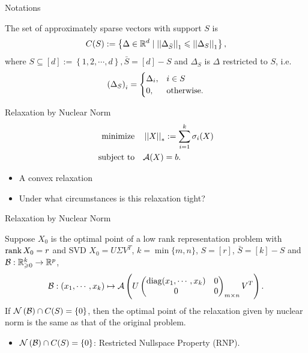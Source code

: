 \documentclass{beamer}
\begin{document}
\begin{frame}{Notations}
    \begin{definition}
        The set of approximately sparse vectors with support \(S\) is
        \[C(S):=\left\{\Delta\in\mathbb R^d\mid\left|\left|\Delta_{\bar S}\right|\right|_1\leqslant\left|\left|\Delta_S\right|\right|_1\right\},\]
        where \(S\subseteq [d]:=\left\{1,2,\cdots,d\right\},\bar S=[d]-S\) and \(\Delta_S\) is \(\Delta\) restricted to \(S\), i.e.
        \[\left(\Delta_S\right)_i=\begin{cases}
            \Delta_i,&i\in S\\
            0,&\textnormal{otherwise}.
        \end{cases}\]
    \end{definition}
\end{frame}

\begin{frame}{Relaxation by Nuclear Norm}
    \[\begin{aligned}
        \textnormal{minimize}\quad & \left|\left|X\right|\right|_\ast:=\sum_{i=1}^k\sigma_i(X)\\
        \textnormal{subject to}\quad & \mathcal A(X)=b.
    \end{aligned}\]
    \begin{itemize}
        \item A convex relaxation
        \item Under what circumstances is this relaxation tight?
    \end{itemize}
\end{frame}

\begin{frame}{Relaxation by Nuclear Norm}
    \begin{theorem}
        Suppose \(X_0\) is the optimal point of a low rank representation problem with \(\operatorname{rank} X_0=r\) and SVD \(X_0=U\Sigma V^T\), \(k=\min\{m,n\}\), \(S=[r]\), \(\bar S=[k]-S\) and \(\mathcal B:\mathbb R_{\geqslant 0}^k\to\mathbb R^p\),
        \[\mathcal B:\left(x_1,\cdots,x_k\right)\mapsto\mathcal A\left(U\begin{pmatrix}
            \operatorname{diag}(x_1,\cdots,x_k) & 0\\
            0 & 0
        \end{pmatrix}_{m\times n}V^T\right).\]
        If \(\mathcal N\left(\mathcal B\right)\cap C(S)=\{0\}\), then the optimal point of the relaxation given by nuclear norm is the same as that of the original problem.
    \end{theorem}
    \begin{itemize}
        \item \(\mathcal N\left(\mathcal B\right)\cap C(S)=\{0\}\): Restricted Nullspace Property (RNP).
    \end{itemize}
\end{frame}
\end{document}
